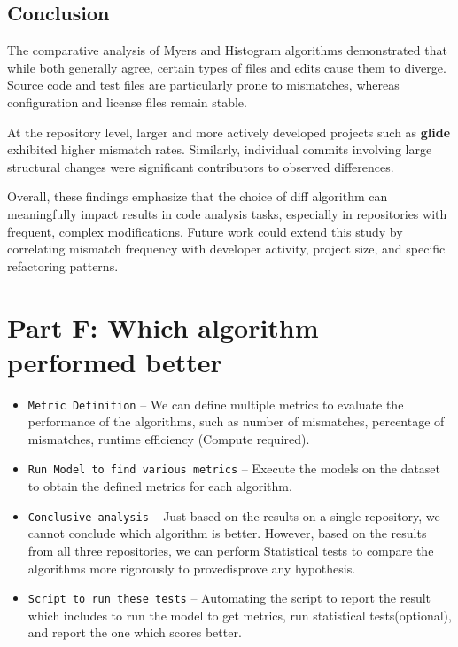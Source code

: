 \documentclass[12pt, a4paper]{report}
\begin{document}
\subsection*{Conclusion}
The comparative analysis of Myers and Histogram algorithms demonstrated that while both generally agree, certain types of files and edits cause them to diverge. Source code and test files are particularly prone to mismatches, whereas configuration and license files remain stable.  

At the repository level, larger and more actively developed projects such as \textbf{glide} exhibited higher mismatch rates. Similarly, individual commits involving large structural changes were significant contributors to observed differences.  

Overall, these findings emphasize that the choice of diff algorithm can meaningfully impact results in code analysis tasks, especially in repositories with frequent, complex modifications. Future work could extend this study by correlating mismatch frequency with developer activity, project size, and specific refactoring patterns.


\section{Part F: Which algorithm performed better}
\begin{itemize}
    \item \texttt{Metric Definition} -- We can define multiple metrics to evaluate the performance of the algorithms, such as number of mismatches, percentage of mismatches, runtime efficiency (Compute required).
    \item \texttt{Run Model to find various metrics} -- Execute the models on the dataset to obtain the defined metrics for each algorithm.
    \item \texttt{Conclusive analysis} -- Just based on the results on a single repository, we cannot conclude which algorithm is better. However, based on the results from all three repositories, we can perform Statistical tests to compare the algorithms more rigorously to prove\/disprove any hypothesis.
    \item \texttt{Script to run these tests} -- Automating the script to report the result which includes to run the model to get metrics, run statistical tests(optional), and report the one which scores better.
\end{itemize}
\end{document}
